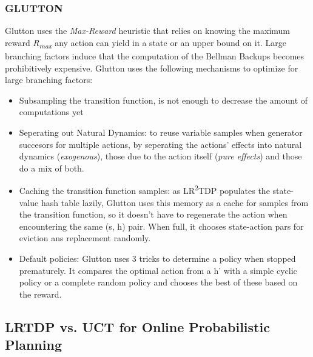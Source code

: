 \documentclass[runningheads,a4paper]{llncs}
\begin{document}
\subsubsection{GLUTTON}
Glutton uses the \emph{Max-Reward} heuristic that relies on knowing the maximum reward \emph{R\textsubscript{max}} any action can yield in a state or an upper bound on it. Large branching factors induce that the computation of the Bellman Backups becomes prohibitively expensive. Glutton uses the following mechanisms to optimize for large branching factors:
\begin{itemize}
	\item Subsampling the transition function, is not enough to decrease the amount of computations yet
	\item Seperating out Natural Dynamics: to reuse variable samples when generator succesors for multiple actions, by seperating the actions' effects into natural dynamics (\emph{exogenous}), those due to the action itself (\emph{pure effects}) and those do a mix of both. 
	\item Caching the transition function samples: as LR\textsuperscript{2}TDP populates the state-value hash table lazily, Glutton uses  this memory as a cache for samples from the transition function, so it doesn't have to regenerate the action when encountering the same (s, h) pair. When full, it chooses state-action pars for eviction ans replacement randomly. 
	\item Default policies: Glutton uses 3 tricks to determine a policy when stopped prematurely. It compares the optimal action from a h' with a simple cyclic policy or a complete random policy and chooses the best of these based on the reward.  
\end{itemize}


\subsection{LRTDP vs. UCT for Online Probabilistic Planning\cite{kolobov2012gourmand}}



\end{document}
